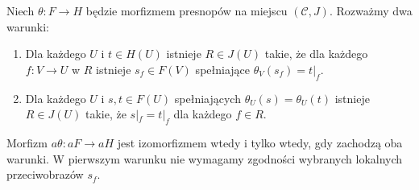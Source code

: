 \begin{twierdzenie}\label{cat:thm:local-sheafification-isomorphism}
Niech $\theta:F\to H$ będzie morfizmem presnopów na miejscu $(\mathcal C,J)$. Rozważmy dwa warunki:
\begin{enumerate}
\item Dla każdego $U$ i $t\in H(U)$ istnieje $R\in J(U)$ takie, że dla każdego $f:V\to U$ w $R$ istnieje $s_f\in F(V)$ spełniające $\theta_V(s_f)=t|_f$.
\item Dla każdego $U$ i $s,t\in F(U)$ spełniających $\theta_U(s)=\theta_U(t)$ istnieje $R\in J(U)$ takie, że $s|_f=t|_f$ dla każdego $f\in R$.
\end{enumerate}
Morfizm $a\theta:aF\to aH$ jest izomorfizmem wtedy i tylko wtedy, gdy zachodzą oba warunki. W pierwszym warunku nie wymagamy zgodności wybranych lokalnych przeciwobrazów $s_f$.
\end{twierdzenie}
